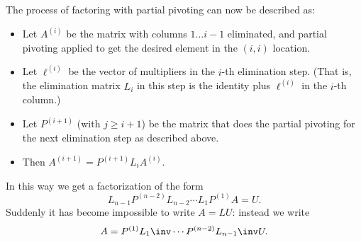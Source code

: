 The process of factoring with partial pivoting can now be
described as:
\begin{itemize}
\item Let $A^{(i)}$ be the matrix with columns $1\ldots i-1$
  eliminated, and partial pivoting applied to get the desired element in
  the $(i,i)$ location.
\item Let $\ell^{(i)}$ be the vector of multipliers in the
  $i$-th elimination step. (That is, the elimination matrix $L_i$ in this
  step is the identity plus $\ell^{(i)}$ in the $i$-th column.)
\item Let $P^{(i+1)}$ (with $j\geq i+1$) be the matrix that does the
  partial pivoting for the next elimination step as described above.
\item Then $A^{(i+1)}=P^{(i+1)}L_iA^{(i)}$.
\end{itemize}
In this way we get a factorization of the form
\[ L_{n-1}P^{(n-2)}L_{n-2}\cdots L_1P^{(1)}A = U. \]
Suddenly it has become impossible to write $A=LU$: instead we
write 
\begin{equation}
  \label{eq:lu-pivot-interleave}
  A=P^{(1)}L_1\inv\cdots P^{(n-2)}L_{n-1}\inv U.
\end{equation}

